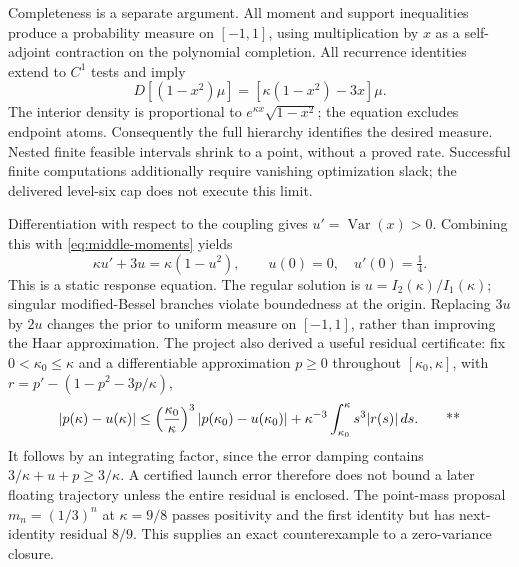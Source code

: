 Completeness is a separate argument. All moment and support inequalities
produce a probability measure on \([-1,1]\), using multiplication by \(x\)
as a self-adjoint contraction on the polynomial completion. All recurrence
identities extend to \(C^1\) tests and imply
\[
 D[(1-x^2)\mu]=[\kappa(1-x^2)-3x]\mu.
\]
The interior density is proportional to
\(e^{\kappa x}\sqrt{1-x^2}\); the equation excludes endpoint atoms.
Consequently the full hierarchy identifies the desired measure. Nested
finite feasible intervals shrink to a point, without a proved rate.
Successful finite computations additionally require vanishing optimization
slack; the delivered level-six cap does not execute this limit.

Differentiation with respect to the coupling gives \(u'=\operatorname{Var}(x)>0\).
Combining this with \eqref{eq:middle-moments} yields
\[
 \kappa u'+3u=\kappa(1-u^2),\qquad u(0)=0,\quad u'(0)=\tfrac14.
\]
This is a static response equation. The regular solution is
\(u=I_2(\kappa)/I_1(\kappa)\); singular modified-Bessel branches violate
boundedness at the origin. Replacing \(3u\) by \(2u\) changes the prior to
uniform measure on \([-1,1]\), rather than improving the Haar approximation.
The project also derived a useful residual certificate: fix
\(0<\kappa_0\le\kappa\) and a differentiable approximation \(p\ge0\)
throughout \([\kappa_0,\kappa]\), with
\(r=p'-(1-p^2-3p/\kappa)\),
\begin{equation}
 |p(\kappa)-u(\kappa)|
 \le \left(\frac{\kappa_0}{\kappa}\right)^3
       |p(\kappa_0)-u(\kappa_0)|
 +\kappa^{-3}\int_{\kappa_0}^{\kappa}s^3|r(s)|\,ds.
 \qquad\text{**}
 \label{eq:middle-response}
\end{equation}
It follows by an integrating factor, since the error damping contains
\(3/\kappa+u+p\ge3/\kappa\). A certified launch error therefore does not
bound a later floating trajectory unless the entire residual is enclosed.
The point-mass proposal \(m_n=(1/3)^n\) at \(\kappa=9/8\) passes positivity
and the first identity but has next-identity residual \(8/9\).
This supplies an exact counterexample to a zero-variance closure.

